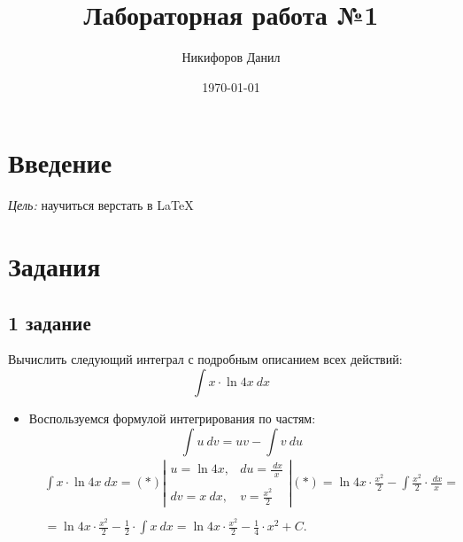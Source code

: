 \documentclass[14pt, a4paper, titlepage, fleqn]{extarticle}
\author{Никифоров Данил}
\title{Лабораторная работа №1}
\date{\today}
\begin{document}
	


    \maketitle
    	
    \tableofcontents
    
    \pagebreak
    	
    \section*{Введение}
    \textit{Цель:} научиться верстать в LaTeX
    	
    
        
    \section*{Задания}
    
    \subsection*{1 задание}
    Вычислить следующий интеграл с подробным описанием всех действий:
    \[\int x \cdot{\ln{4x}} ~ dx \]
    
    \begin{itemize}
    
        \item Воспользуемся формулой интегрирования по частям: \[\int u ~ dv = uv - \int v ~ du\]
        \[\begin{aligned} 
        	& \int x \cdot{\ln{4x}} ~ dx = (*) \left\vert{
        	\begin{matrix}
        	
        		u = \ln{4x}, & du = \frac{~dx}{x} \\ 
        		\\
        		dv = x ~dx, & v = \frac{x^2}{2}
        	
        	\end{matrix}} \right\vert (*) = \ln{4x} \cdot{\frac{x^2}{2}} - \int{\frac{x^2}{2} \cdot \frac{~dx}{x}} = \\\\
        &= \ln{4x} \cdot{\frac{x^2}{2}} - \frac{1}{2} \cdot \int{x ~dx} = \ln{4x} \cdot \frac{x^2}{2} - \frac{1}{4} \cdot{x^2} + C.
        \end{aligned}\]
	   
    \end{itemize}
    		
\end{document}
